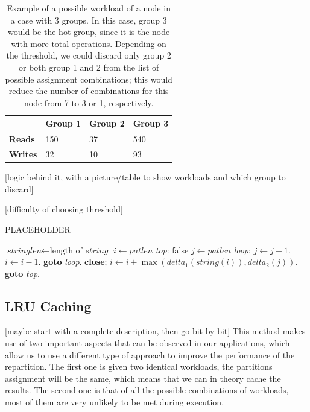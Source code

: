\begin{table}[!htb]
  \centering
  \begin{tabular}{l l l l}
    \hline
    & \textbf{Group 1} & \textbf{Group 2} & \textbf{Group 3} \\
    \hline
    \textbf{Reads} & 150 & 37 & 540 \\
    \textbf{Writes} & 32 & 10 & 93 \\
    \hline
  \end{tabular}
  \caption{Example of a possible workload of a node in a case with 3 groups. In this case, group 3 would be the hot group, since it is the node with more total operations. Depending on the threshold, we could discard only group 2 or both group 1 and 2 from the list of possible assignment combinations; this would reduce the number of combinations for this node from 7 to 3 or 1, respectively.}\label{tab:workload-example}
\end{table}

[logic behind it, with a picture/table to show workloads and which group to discard]

[difficulty of choosing threshold]

\begin{algorithm}
  \caption{PLACEHOLDER}\label{alg:hot-groups}
  \begin{algorithmic}[1]
  \State $\textit{stringlen} \gets \text{length of }\textit{string}$
  \State $i \gets \textit{patlen}$
  \State \emph{top}:
   \Return false
  \EndIf
  \State $j \gets \textit{patlen}$
  \State \emph{loop}:
  \State $j \gets j-1$.
  \State $i \gets i-1$.
  \State \textbf{goto} \emph{loop}.
  \State \textbf{close};
  \EndIf
  \State $i \gets i+\max(\textit{delta}_1(\textit{string}(i)),\textit{delta}_2(j))$.
  \State \textbf{goto} \emph{top}.
  \EndProcedure
  \end{algorithmic}
  \end{algorithm}

\subsection{LRU Caching}\label{sec:lru-caching}
[maybe start with a complete description, then go bit by bit]
This method makes use of two important aspects that can be observed in our applications, which allow us to use a different type of approach to improve the performance of the repartition. The first one is given two identical workloads, the partitions assignment will be the same, which means that we can in theory cache the results. The second one is that of all the possible combinations of workloads, most of them are very unlikely to be met during execution.

